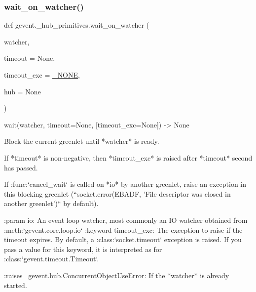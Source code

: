 \mbox{\label{namespacegevent_1_1__hub__primitives_ae484b73e4c293e8788d5857165c2e230}} 
\subsubsection{\texorpdfstring{wait\+\_\+on\+\_\+watcher()}{wait\_on\_watcher()}}
{\footnotesize\ttfamily def gevent.\+\_\+hub\+\_\+primitives.\+wait\+\_\+on\+\_\+watcher (\begin{DoxyParamCaption}\item[{}]{watcher,  }\item[{}]{timeout = {\ttfamily None},  }\item[{}]{timeout\+\_\+exc = {\ttfamily \hyperlink{classgevent_1_1__util_1_1___n_o_n_e}{\+\_\+\+N\+O\+NE}},  }\item[{}]{hub = {\ttfamily None} }\end{DoxyParamCaption})}

\begin{DoxyVerb}wait(watcher, timeout=None, [timeout_exc=None]) -> None

Block the current greenlet until *watcher* is ready.

If *timeout* is non-negative, then *timeout_exc* is raised after
*timeout* second has passed.

If :func:`cancel_wait` is called on *io* by another greenlet,
raise an exception in this blocking greenlet
(``socket.error(EBADF, 'File descriptor was closed in another
greenlet')`` by default).

:param io: An event loop watcher, most commonly an IO watcher obtained from
    :meth:`gevent.core.loop.io`
:keyword timeout_exc: The exception to raise if the timeout expires.
    By default, a :class:`socket.timeout` exception is raised.
    If you pass a value for this keyword, it is interpreted as for
    :class:`gevent.timeout.Timeout`.

:raises ~gevent.hub.ConcurrentObjectUseError: If the *watcher* is
    already started.
\end{DoxyVerb}
 \mbox{\label{namespacegevent_1_1__hub__primitives_a50d1746d1e26dabc9e0b9eb1f3a226d3}} 
